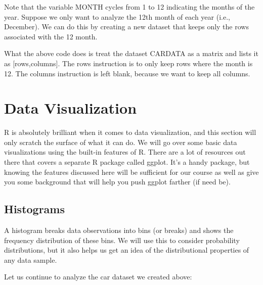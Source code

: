 \documentclass[
]{book}
\newenvironment{Shaded}{\begin{snugshade}}{\end{snugshade}}
\newcommand{\DecValTok}[1]{\textcolor[rgb]{0.00,0.00,0.81}{#1}}
\newcommand{\FunctionTok}[1]{\textcolor[rgb]{0.13,0.29,0.53}{\textbf{#1}}}
\newcommand{\NormalTok}[1]{#1}
\newcommand{\OtherTok}[1]{\textcolor[rgb]{0.56,0.35,0.01}{#1}}
\newcommand{\SpecialCharTok}[1]{\textcolor[rgb]{0.81,0.36,0.00}{\textbf{#1}}}
\begin{document}
Note that the variable MONTH cycles from 1 to 12 indicating the months of the year. Suppose we only want to analyze the 12th month of each year (i.e., December). We can do this by creating a new dataset that keeps only the rows associated with the 12 month.

\begin{Shaded}
\end{Shaded}

What the above code does is treat the dataset CARDATA as a matrix and lists it as {[}rows,columns{]}. The rows instruction is to only keep rows where the month is 12. The columns instruction is left blank, because we want to keep all columns.

\section{Data Visualization}\label{data-visualization}

R is absolutely brilliant when it comes to data visualization, and this section will only scratch the surface of what it can do. We will go over some basic data visualizations using the built-in features of R. There are a lot of resources out there that covers a separate R package called ggplot. It's a handy package, but knowing the features discussed here will be sufficient for our course as well as give you some background that will help you push ggplot farther (if need be).

\subsection{Histograms}\label{histograms}

A histogram breaks data observations into bins (or breaks) and shows the frequency distribution of these bins. We will use this to consider probability distributions, but it also helps us get an idea of the distributional properties of any data sample.

Let us continue to analyze the car dataset we created above:

\begin{Shaded}
\end{Shaded}
\end{document}

